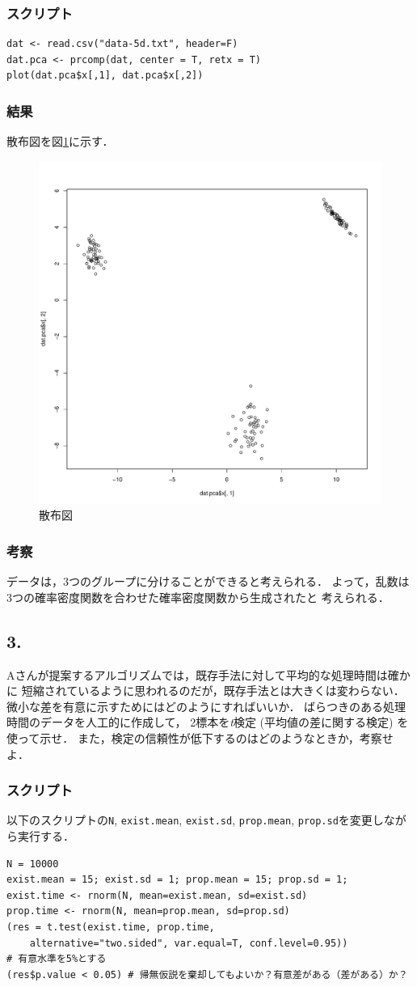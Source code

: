 \documentclass{jsarticle}
\begin{document}
\subsubsection*{スクリプト}
\begin{lstlisting}[basicstyle=\ttfamily\footnotesize, frame=single]
dat <- read.csv("data-5d.txt", header=F)
dat.pca <- prcomp(dat, center = T, retx = T)
plot(dat.pca$x[,1], dat.pca$x[,2])
\end{lstlisting}

\subsubsection*{結果}
散布図を図\ref{img:data-5D}に示す．
\begin{figure}[b]
	\centering
	\includegraphics[width=.25\hsize]{img/data-5d.pdf}
	\caption{散布図}
	\label{img:data-5D}
\end{figure}

\subsubsection*{考察}
データは，3つのグループに分けることができると考えられる．
よって，乱数は3つの確率密度関数を合わせた確率密度関数から生成されたと
考えられる．

\subsection*{3.}
Aさんが提案するアルゴリズムでは，既存手法に対して平均的な処理時間は確かに
短縮されているように思われるのだが，既存手法とは大きくは変わらない．
微小な差を有意に示すためにはどのようにすればいいか．
ばらつきのある処理時間のデータを人工的に作成して，
2標本を\emph{t}検定 (平均値の差に関する検定) を使って示せ．
また，検定の信頼性が低下するのはどのようなときか，考察せよ．

\subsubsection*{スクリプト}
以下のスクリプトの\verb|N|, \verb|exist.mean|, \verb|exist.sd|,
\verb|prop.mean|, \verb|prop.sd|を変更しながら実行する．
\begin{lstlisting}[basicstyle=\ttfamily\footnotesize, frame=single]
N = 10000
exist.mean = 15; exist.sd = 1; prop.mean = 15; prop.sd = 1;
exist.time <- rnorm(N, mean=exist.mean, sd=exist.sd)
prop.time <- rnorm(N, mean=prop.mean, sd=prop.sd)
(res = t.test(exist.time, prop.time,
	alternative="two.sided", var.equal=T, conf.level=0.95))
# 有意水準を5%とする
(res$p.value < 0.05) # 帰無仮説を棄却してもよいか？有意差がある（差がある）か？
\end{lstlisting}
\end{document}
